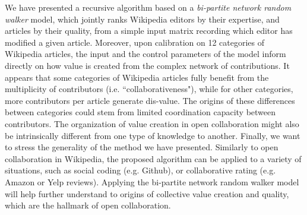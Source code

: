 We have presented a recursive algorithm based on a {\it bi-partite network random walker} model, which jointly ranks Wikipedia editors by their expertise, and articles by their quality, from a simple input matrix recording which editor has modified a given article. Moreover, upon calibration on 12 categories of Wikipedia articles, the input and the control parameters of the model inform directly on how value is created from the complex network of contributions. It appears that some categories of Wikipedia articles fully benefit from the multiplicity of contributors (i.e. ``collaborativeness"), while for other categories, more contributors per article generate dis-value. The origins of these differences between categories could stem from limited coordination capacity between contributors. The organization of value creation in open collaboration might also be intrinsically different from one type of knowledge to another. Finally, we want to stress the generality of the method we have presented. Similarly to open collaboration in Wikipedia, the proposed algorithm can be applied to a variety of situations, such as social coding (e.g. Github), or collaborative rating (e.g. Amazon or Yelp reviews). Applying the bi-partite network random walker model will help further understand to origins of collective value creation and quality, which are the hallmark of open collaboration.
